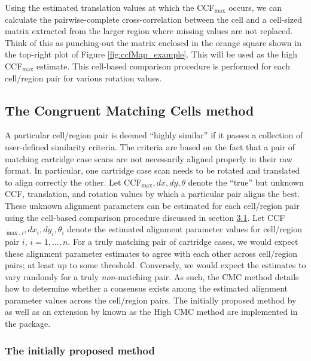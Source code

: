 Using the estimated translation values at which the CCF\(_{\max}\)
occurs, we can calculate the pairwise-complete cross-correlation between
the cell and a cell-sized matrix extracted from the larger region where
missing values are not replaced. Think of this as punching-out the
matrix enclosed in the orange square shown in the top-right plot of
Figure \ref{fig:ccfMap_example}. This will be used as the high
CCF\(_{\max}\) estimate. This cell-based comparison procedure is
performed for each cell/region pair for various rotation values.

\hypertarget{the-congruent-matching-cells-method}{%
\subsection{The Congruent Matching Cells
method}\label{the-congruent-matching-cells-method}}

A particular cell/region pair is deemed ``highly similar'' if it passes
a collection of user-defined similarity criteria. The criteria are based
on the fact that a pair of matching cartridge case scans are not
necessarily aligned properly in their raw format. In particular, one
cartridge case scan needs to be rotated and translated to align
correctly the other. Let CCF\(_{\max}, dx, dy, \theta\) denote the
``true'' but unknown CCF, translation, and rotation values by which a
particular pair aligns the best. These unknown alignment parameters can
be estimated for each cell/region pair using the cell-based comparison
procedure discussed in section
\protect\hyperlink{comparisonProcedure}{3.1}. Let
CCF\(_{\max,i}, dx_i, dy_i, \theta_i\) denote the estimated alignment
parameter values for cell/region pair \(i\), \(i = 1,...,n\). For a
truly matching pair of cartridge cases, we would expect these alignment
parameter estimates to agree with each other across cell/region pairs;
at least up to some threshold. Conversely, we would expect the estimates
to vary randomly for a truly \emph{non}-matching pair. As such, the CMC
method details how to determine whether a consensus exists among the
estimated alignment parameter values across the cell/region pairs. The
initially proposed method by \citet{song_proposed_2013} as well as an
extension by \citet{tong_improved_2015} known as the High CMC method are
implemented in the  package.

\hypertarget{initialMethod}{%
\subsubsection{The initially proposed method}\label{initialMethod}}

